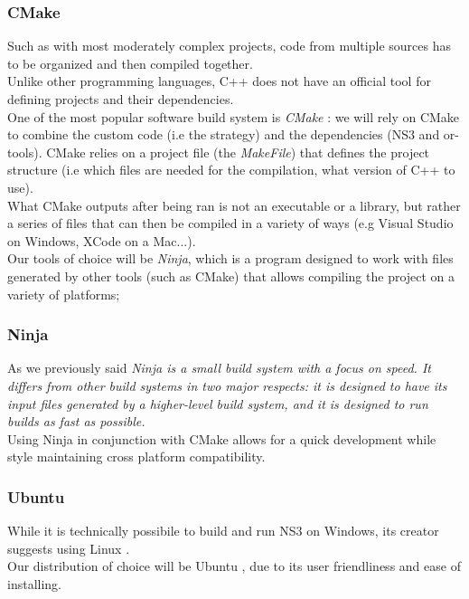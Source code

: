 \subsubsection{CMake}
Such as with most moderately complex projects, code from multiple sources has to be organized and then compiled together. \\ 
Unlike other programming languages, C++ does not have an official tool for defining projects and their dependencies.\\
One of the most popular software build system is \textit{CMake} \cite{cmake}: we will rely on CMake to combine the custom code (i.e the strategy) and the dependencies (NS3 and or-tools).
CMake relies on a project file (the \textit{MakeFile}) that defines the project structure (i.e which files are needed for the compilation, what version of C++ to use). \\
What CMake outputs after being ran is not an executable or a library, but rather a series of files that can then be compiled in a variety of ways (e.g Visual Studio on Windows, XCode on a Mac...). \\
Our tools of choice will be \textit{Ninja}, which is a program designed to work with files generated by other tools (such as CMake) that allows compiling the project on a variety of platforms;
 \\

\subsubsection{Ninja}
As we previously said \textit{Ninja is a small build system with a focus on speed. It differs from other build systems in two major respects: it is designed to have its input files generated by a higher-level build system, and it is designed to run builds as fast as possible.} \cite{ninja}  \\
Using Ninja in conjunction with CMake allows for a quick development while style maintaining cross platform compatibility.

\subsubsection{Ubuntu}
While it is technically possibile to build and run NS3 on Windows, its creator suggests using Linux \cite{ns3-docs} . \\ Our distribution of choice will be Ubuntu  \cite{ubuntu}, due to its user friendliness and ease of installing.



